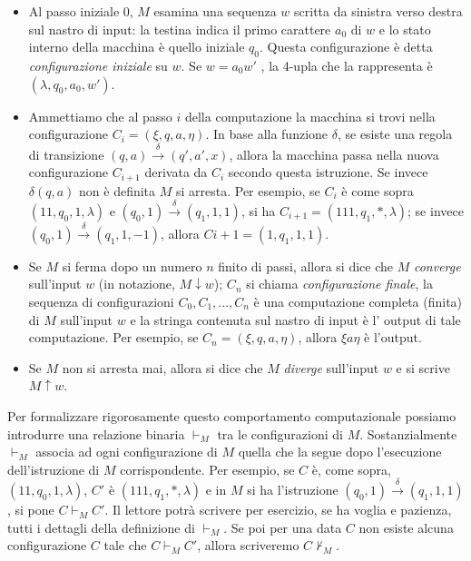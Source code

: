 \begin{itemize}
    \item Al passo iniziale $0$, $M$ esamina una sequenza $w$ scritta da sinistra
          verso destra sul nastro di input: la testina indica il primo carattere
          $a_0$ di $w$ e lo stato interno della macchina è quello iniziale $q_0$.
          Questa configurazione è detta
          \textit{configurazione iniziale} su $w$.
          Se $w = a_0w'$ , la 4-upla che la rappresenta è
          $(\lambda, q_0, a_0, w')$.
    \item Ammettiamo che al passo $i$ della computazione la macchina si trovi
          nella
          configurazione $C_i = (\xi, q, a, \eta)$.
          In base alla funzione $\delta$, se esiste una regola di transizione
          $(q, a) \xrightarrow{ \ \delta \ }  (q', a', x)$,
          allora la macchina passa nella nuova configurazione $C_{i+1}$ derivata
          da $C_i$ secondo questa istruzione. Se invece $\delta(q, a)$
          non è definita $M$ si arresta.
          Per esempio, se $C_i$ è come sopra
          $(11, q_0, 1, \lambda)$ e
          $(q_0, 1) \xrightarrow{ \ \delta \ }  (q_1, 1, 1)$, si ha
          $C_{i+1} = (111, q_1, *, \lambda)$; se invece
          $(q_0, 1) \xrightarrow{ \ \delta \ }  (q_1, 1, -1)$,
          allora $C{i+1}= (1, q_1, 1, 1)$.
    \item Se $M$ si ferma dopo un numero $n$ finito di passi,
          allora si dice che $M$ \textit{converge}
          sull'input $w$ (in notazione, $M \downarrow w$);
          $C_n$ si chiama \textit{configurazione finale}, la
          sequenza di configurazioni $C_0, C_1, ..., C_n$ è una computazione
          completa (finita)
          di $M$ sull'input $w$ e la stringa contenuta sul nastro di input è l'
          output di tale computazione.
          Per esempio, se $C_n = (\xi, q, a, \eta)$, allora $\xi a \eta$ è l'output.
    \item Se $M$ non si arresta mai, allora si dice che $M$ \textit{diverge}
          sull'input $w$ e si scrive
          $M \uparrow w$.
\end{itemize}

Per formalizzare rigorosamente questo comportamento computazionale possiamo
introdurre una relazione binaria $\vdash_M$ tra le configurazioni di $M$.
Sostanzialmente $\vdash_M$ associa ad ogni configurazione di $M$ quella che la
segue dopo l'esecuzione dell'istruzione di $M$ corrispondente.
Per esempio, se $C$ è, come sopra, $(11, q_0, 1, \lambda)$, $C'$ è
$(111, q_1, *, \lambda)$ e in $M$ si ha l'istruzione
$(q_0, 1) \xrightarrow{ \ \delta \ } (q_1, 1 , 1)$, si
pone $C \vdash_M C'$.
Il lettore potrà scrivere per esercizio, se ha voglia e pazienza,
tutti i dettagli della definizione di $\vdash_M$.
Se poi per una data $C$ non esiste alcuna configurazione $C$ tale che
$C \vdash_M C'$,
allora scriveremo $C \nvdash_M$.\\

